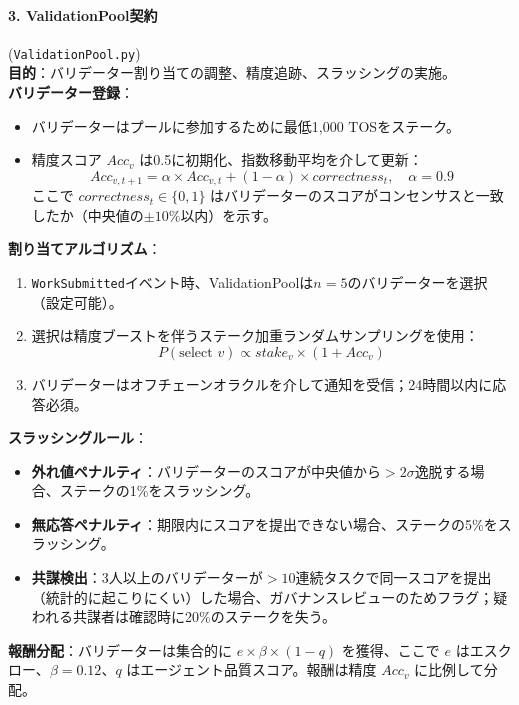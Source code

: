 \documentclass[11pt]{article}
\begin{document}
\paragraph{3. ValidationPool契約} (\texttt{ValidationPool.py})\\
\textbf{目的}：バリデーター割り当ての調整、精度追跡、スラッシングの実施。\\
\textbf{バリデーター登録}：
\begin{itemize}[noitemsep]
  \item バリデーターはプールに参加するために最低1,000 TOSをステーク。
  \item 精度スコア $Acc_v$ は0.5に初期化、指数移動平均を介して更新：
    \begin{equation}
    Acc_{v,t+1} = \alpha \times Acc_{v,t} + (1-\alpha) \times correctness_t, \quad \alpha = 0.9
    \end{equation}
    ここで $correctness_t \in \{0,1\}$ はバリデーターのスコアがコンセンサスと一致したか（中央値の$\pm10\%$以内）を示す。
\end{itemize}
\textbf{割り当てアルゴリズム}：
\begin{enumerate}[noitemsep]
  \item \texttt{WorkSubmitted}イベント時、ValidationPoolは$n=5$のバリデーターを選択（設定可能）。
  \item 選択は精度ブーストを伴うステーク加重ランダムサンプリングを使用：
    \begin{equation}
    P(\text{select } v) \propto stake_v \times (1 + Acc_v)
    \end{equation}
  \item バリデーターはオフチェーンオラクルを介して通知を受信；24時間以内に応答必須。
\end{enumerate}
\textbf{スラッシングルール}：
\begin{itemize}[noitemsep]
  \item \textbf{外れ値ペナルティ}：バリデーターのスコアが中央値から$>2\sigma$逸脱する場合、ステークの1\%をスラッシング。
  \item \textbf{無応答ペナルティ}：期限内にスコアを提出できない場合、ステークの5\%をスラッシング。
  \item \textbf{共謀検出}：3人以上のバリデーターが$>10$連続タスクで同一スコアを提出（統計的に起こりにくい）した場合、ガバナンスレビューのためフラグ；疑われる共謀者は確認時に20\%のステークを失う。
\end{itemize}
\textbf{報酬分配}：バリデーターは集合的に $e \times \beta \times (1-q)$ を獲得、ここで $e$ はエスクロー、$\beta=0.12$、$q$ はエージェント品質スコア。報酬は精度 $Acc_v$ に比例して分配。
\end{document}
